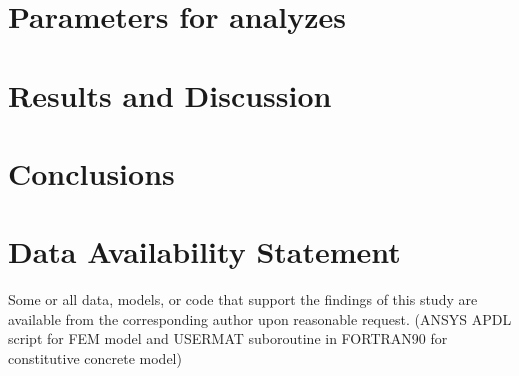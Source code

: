 \documentclass[Journal,letterpaper]{ascelike-new}
\begin{document}
\section{Parameters for analyzes}

\section{Results and Discussion}



\section{Conclusions}


\section{Data Availability Statement}

Some or all data, models, or code that support the findings of this study are available from the corresponding author upon reasonable request. (ANSYS APDL script for FEM model and USERMAT suboroutine in FORTRAN90 for constitutive concrete model)

\pagebreak
%
%
%
%
%
%
%

%
\end{document}
